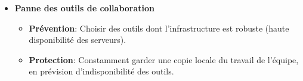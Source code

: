 \begin{itemize}
  \item \textbf{Panne des outils de collaboration}
        \begin{itemize}
          \item \textbf{Prévention}: Choisir des outils dont l'infrastructure est robuste (haute disponibilité des serveurs).
          \item \textbf{Protection}: Constamment garder une copie locale du travail de l'équipe, en prévision d'indisponibilité des outils.
        \end{itemize}

\end{itemize}
